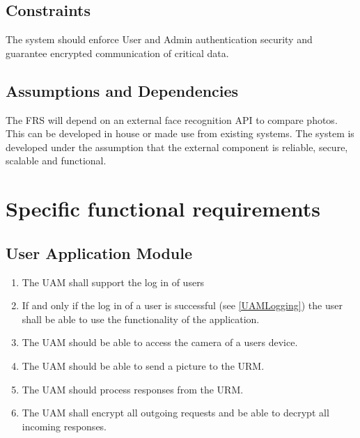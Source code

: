 \documentclass[a4paper,11pt]{article}
\begin{document}
\subsection{Constraints}
The system should enforce User and Admin authentication security and guarantee encrypted communication of critical data.

\subsection{Assumptions and Dependencies}
The FRS will depend on an external face recognition API to compare photos. This can be developed in house or made use from existing systems. The system is developed under the assumption that the external component is reliable, secure, scalable and functional.

\newpage
\section{Specific functional requirements}

\subsection{User Application Module}
\begin{enumerate}[leftmargin=0.8in]
		\item \label{UAMLogging} The UAM shall support the log in of users
    \item If and only if the log in of a user is successful (see \ref{UAMLogging}) the user shall be able to use the functionality of the application.
		\item \label{UAMCAM} The UAM should be able to access the camera of a users device.
    \item \label{UAMCAM} The UAM should be able to send a picture to the URM.
    \item \label{UAMRet} The UAM should process responses from the URM.
		\item The UAM shall encrypt all outgoing requests and be able to decrypt all incoming responses.
\end{enumerate}
\end{document}
